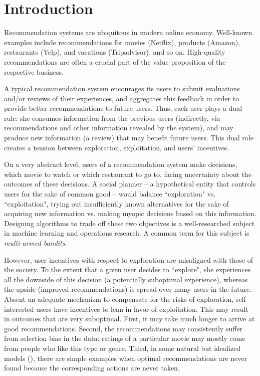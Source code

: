 \section{Introduction}

Recommendation systems are ubiquitous in modern online economy. Well-known examples include recommendations for movies (\eg  Netflix), products (\eg  Amazon), restaurants (\eg  Yelp), and vacations (\eg Tripadvisor).
and so on. High-quality recommendations are often a crucial part of the value proposition of the respective business. 

A typical recommendation system encourages its users to submit evaluations and/or reviews of their experiences, and aggregates this feedback in order to provide better recommendations to future users. Thus, each user plays a dual rule: she consumes information from the previous users (indirectly, via recommendations and other information revealed by the system), and may produce new information (\eg  a review) that may benefit future users. This dual role creates a tension between exploration, exploitation, and users' incentives.

On a very abstract level, users of a recommendation system make decisions, \eg which movie to watch or which restaurant to go to, facing uncertainty about the outcomes of these decisions. A social planner -- a hypothetical entity that controls users for the sake of common good -- would balance ``exploration" vs.  ``exploitation", \ie  trying out insufficiently known alternatives for the sake of acquiring new information vs. making myopic decisions based on this information. Designing algorithms to trade off these two objectives is a well-researched subject in machine learning and operations research. A common term for this subject is \emph{multi-armed bandits}.

However, user incentives with respect to exploration are misaligned with those of the society. To the extent that a given user decides to ``explore", she experiences all the downside of this decision (a potentially suboptimal experience), whereas the upside (improved recommendations) is spread over many users in the future. Absent an adequate mechanism to compensate for the risks of exploration, self-interested users have incentives to lean in favor of exploitation. This may result in outcomes that are very suboptimal. First, it may take much longer to arrive at good recommendations. Second, the recommendations may consistently suffer from selection bias in the data: \eg  ratings of a particular movie may mostly come from people who like this type or genre. Third, in some natural but idealized models (\eg  \cite{Kremer-JPE14,ICexploration-ec15}), there are simple  examples when optimal recommendations are never found because the corresponding actions are never taken.

